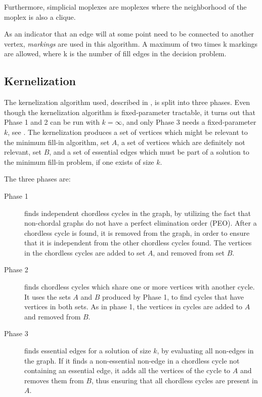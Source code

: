 \documentclass{article}
\begin{document}
	Furthermore, simplicial moplexes are moplexes where the neighborhood of the moplex is also a clique.

	As an indicator that an edge will at some point need to be connected to another vertex, \emph{markings} are used in this algorithm. 
	A maximum of two times k markings are allowed, where k is the number of fill edges in the decision problem.

		\subsection{Kernelization}
		The kernelization algorithm used, described in \cite{kernel}, is split into three phases. Even though the kernelization algorithm is fixed-parameter tractable, it turns out that Phase 1 and 2 can be run with $k=\infty$, and only Phase 3 needs a fixed-parameter $k$, see \cite{polynomial-approx}. The kernelization produces a set of vertices which might be relevant to the minimum fill-in algorithm, set $A$, a set of vertices which are definitely not relevant, set $B$, and a set of essential edges which must be part of a solution to the minimum fill-in problem, if one exists of size $k$. 

		The three phases are:
		\begin{description}
			\item[Phase 1] finds independent chordless cycles in the graph, by utilizing the fact that non-chordal graphs do not have a perfect elimination order (PEO). After a chordless cycle is found, it is removed from the graph, in order to ensure that it is independent from the other chordless cycles found. The vertices in the chordless cycles are added to set $A$, and removed from set $B$.
			\item[Phase 2] finds chordless cycles which share one or more vertices with another cycle. It uses the sets $A$ and $B$ produced by Phase 1, to find cycles that have vertices in both sets. As in phase 1, the vertices in cycles are added to $A$ and removed from $B$.
			\item[Phase 3] finds essential edges for a solution of size $k$, by evaluating all non-edges in the graph. If it finds a non-essential non-edge in a chordless cycle not containing an essential edge, it adds all the vertices of the cycle to $A$ and removes them from $B$, thus ensuring that all chordless cycles are present in $A$.
		\end{description}
\end{document}
